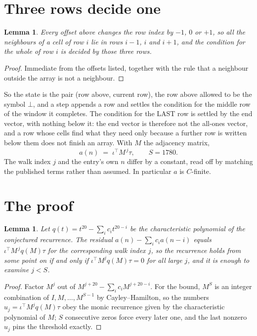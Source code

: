 \documentclass[11pt,a4paper]{article}
\theoremstyle{plain}
\newtheorem{lemma}[theorem]{Lemma}
\theoremstyle{definition}
\begin{document}
\section{Three rows decide one}

\begin{lemma}\label{lem:win}
Every offset above changes the row index by $-1$, $0$ or $+1$, so all the neighbours of a cell
of row $i$ lie in rows $i-1$, $i$ and $i+1$, and the condition for the whole of row $i$ is
decided by those three rows.
\end{lemma}

\begin{proof}
Immediate from the offsets listed, together with the rule that a neighbour outside the array is
not a neighbour.
\end{proof}

So the state is the pair (row above, current row), the row above allowed to be the symbol
$\bot$, and a step appends a row and settles the condition for the middle row of the window it
completes. The condition for the LAST row is settled by the end vector, with nothing below it:
the end vector is therefore not the all-ones vector, and a row whose cells find what they need
only because a further row is written below them does not finish an array. With $M$ the
adjacency matrix,
\[
a(n)\;=\;\iota^{\!\top}M^{\,j}\tau ,\qquad S=1780.
\]
The walk index $j$ and the entry's own $n$ differ by a constant, read off by matching the
published terms rather than assumed. In particular $a$ is $C$-finite.

\section{The proof}

\begin{lemma}\label{lem:crit}
Let $q(t)=t^{20}-\sum_i c_it^{20-i}$ be the characteristic polynomial of the
conjectured recurrence. The residual $a(n)-\sum_ic_ia(n-i)$ equals
$\iota^{\!\top}M^{\,j}q(M)\tau$ for the corresponding walk index $j$, so the recurrence
holds from some point on if and only if $\iota^{\!\top}M^{j}q(M)\tau=0$ for all large $j$,
and it is enough to examine $j<S$.
\end{lemma}

\begin{proof}
Factor $M^{j}$ out of $M^{j+20}-\sum_ic_iM^{j+20-i}$. For the bound, $M^{S}$
is an integer combination of $I,M,\dots,M^{S-1}$ by Cayley--Hamilton, so the numbers
$u_j=\iota^{\!\top}M^{j}q(M)\tau$ obey the monic recurrence given by the characteristic
polynomial of $M$; $S$ consecutive zeros force every later one, and the last nonzero $u_j$
pins the threshold exactly.
\end{proof}
\end{document}

